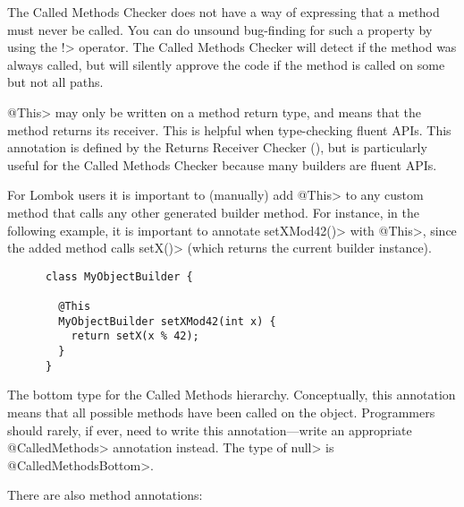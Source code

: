 \begin{description}
  The Called Methods Checker does not have a way of expressing that a
  method must never be called.  You can do unsound bug-finding for such a
  property by using the \<!> operator.  The Called Methods Checker will
  detect if the method was always called, but will silently approve the code
  if the method is called on some but not all paths.

\item[\refqualclass{common/returnsreceiver/qual}{This}]
  \<@This> may only be written on a method return type, and means that the method returns its receiver.
  This is helpful when type-checking fluent APIs. This annotation is defined by the
  Returns Receiver Checker (), but is particularly useful
  for the Called Methods Checker because many builders are fluent APIs.

  For Lombok users it is important to (manually) add \<@This> to any custom method that calls any other
  generated builder method. For instance, in the following example, it is important to annotate
  \<setXMod42()> with \<@This>, since the added method calls \<setX()> (which returns the current builder
  instance).

  \begin{Verbatim}
      class MyObjectBuilder {

        @This
        MyObjectBuilder setXMod42(int x) {
          return setX(x % 42);
        }
      }
  \end{Verbatim}

\item[\refqualclass{checker/calledmethods/qual}{CalledMethodsBottom}]
  The bottom type for the Called Methods hierarchy. Conceptually, this annotation
  means that all possible methods have been called on the object. Programmers should rarely,
  if ever, need to write this annotation---write an appropriate \<@CalledMethods> annotation
  instead. The type of \<null> is \<@CalledMethodsBottom>.

\end{description}

There are also method annotations:

